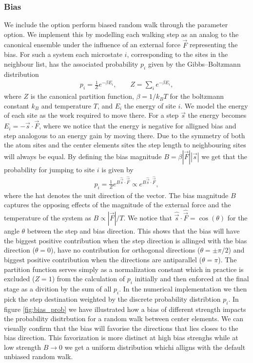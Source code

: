 
\subsubsection{Bias} %
We include the option perform biased random walk through the  parameter option. We implement this by modelling each
walking step as an analog to the canonical ensemble under the influence of an
external force $\vec{F}$ representing the bias. For such a system each
microstate $i$, corresponding to the sites in the neighbour list, has the
associated probability $p_i$ given by the Gibbs–Boltzmann distribution
\begin{align*}
  p_{i} = \frac{1}{Z}e^{-\beta E_i}, \qquad Z = \sum_i e^{-\beta E_i},
\end{align*}
where $Z$ is the canonical partition function, $\beta = 1/k_B T$ for the
boltzmann constant $k_B$ and temperature $T$, and $E_i$ the energy of site $i$.
We model the energy of each site as the work required to move there. For a step
$\vec{s}$ the energy becomes $E_i = -\vec{s}\cdot\vec{F}$, where we notice that
the energy is negative for alligned bias and step analogous to an energy gain by
moving there. Due to the symmetry of both the atom sites and the center elements
sites the step length to neighbouring sites will always be equal. By defining
the bias magnitude $B = \beta|\vec{F}||\vec{s}|$ we get that the probability for
jumping to site $i$ is given by
\begin{align*}
  p_i = \frac{1}{Z}e^{B\hat{\vec{s}}\cdot\hat{\vec{F}}} \propto e^{B\hat{\vec{s}}\cdot\hat{\vec{F}}},
\end{align*}
 where the hat denotes the unit direction of the vector. The bias magnitude $B$
 captures the opposing effects of the magnitude of the external force and the
 temperature of the system as $B\propto |\vec{F}|/T$. We notice that
 $\hat{\vec{s}}\cdot\hat{\vec{F}} = \cos{(\theta)}$ for the angle $\theta$
 between the step and bias direction. This shows that the bias will have the
 biggest positive contribution when the step direction is allinged with the bias
 direction ($\theta = 0$), have no contribution for orthogonal directions
 ($\theta = \pm \pi/2$) and biggest positive contribution when the directions
 are antiparallel ($\theta = \pi$). The partition function serves simply as a
 normalization constant which in practice is  excluded ($Z = 1$) from the
 calculation of $p_i$ initially and then enforced at the final stage as a
 divition by the sum of all $p_i$. In the numerical implementation we then pick
 the step destination weighted by the discrete probability distribtion $p_i$. In
 figure \ref{fig:bias_prob} we have illustrated how a bias of different strength impacts the probability disitrbution for a random walk between center elements. We can visually confirm that the bias will favorise the directions that lies closes to the bias direction. This favorization is more distinct at high bias strenghs while at low strength $B\to0$ we get a uniform distribution whichi alligns with the default unbiased random walk. 


